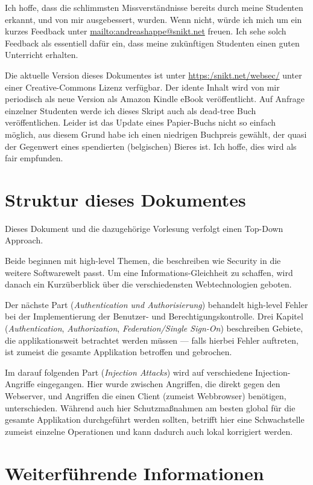 Ich hoffe, dass die schlimmsten Missverständnisse bereits durch meine Studenten erkannt, und von mir ausgebessert, wurden. Wenn nicht, würde ich mich um ein kurzes Feedback unter \url{mailto:andreashappe@snikt.net} freuen. Ich sehe solch Feedback als essentiell dafür ein, dass meine zukünftigen Studenten einen guten Unterricht erhalten.

Die aktuelle Version dieses Dokumentes ist unter \url{https:/snikt.net/websec/} unter einer Creative-Commons Lizenz verfügbar. Der idente Inhalt wird von mir periodisch als neue Version als Amazon Kindle eBook veröffentlicht. Auf Anfrage einzelner Studenten werde ich dieses Skript auch als dead-tree Buch veröffentlichen. Leider ist das Update eines Papier-Buchs nicht so einfach möglich, aus diesem Grund habe ich einen niedrigen Buchpreis gewählt, der quasi der Gegenwert eines spendierten (belgischen) Bieres ist. Ich hoffe, dies wird als fair empfunden.

\section{Struktur dieses Dokumentes}

Dieses Dokument und die dazugehörige Vorlesung verfolgt einen Top-Down Approach.

Beide beginnen mit high-level Themen, die beschreiben wie Security in die weitere Softwarewelt passt. Um eine Informations-Gleichheit zu schaffen, wird danach ein Kurzüberblick über die verschiedensten Webtechnologien geboten.

Der nächste Part (\textit{Authentication und Authorisierung}) behandelt high-level Fehler bei der Implementierung der Benutzer- und Berechtigungskontrolle. Drei Kapitel (\textit{Authentication}, \textit{Authorization}, \textit{Federation/Single Sign-On}) beschreiben Gebiete, die applikationsweit betrachtet werden müssen --- falls hierbei Fehler auftreten, ist zumeist die gesamte Applikation betroffen und gebrochen.

Im darauf folgenden Part (\textit{Injection Attacks}) wird auf verschiedene Injection-Angriffe eingegangen. Hier wurde zwischen Angriffen, die direkt gegen den Webserver, und Angriffen die einen Client (zumeist Webbrowser) benötigen, unterschieden. Während auch hier Schutzmaßnahmen am besten global für die gesamte Applikation durchgeführt werden sollten, betrifft hier eine Schwachstelle zumeist einzelne Operationen und kann dadurch auch lokal korrigiert werden.

\section{Weiterführende Informationen}


